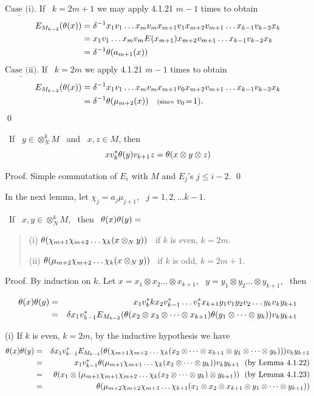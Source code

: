 \ni${\underline{\mbox{Case (i)}}}$. If \ $k=2m+1$ we may apply
4.1.21
$m\!-\!1$ times to obtain
\begin{eqnarray*}
E_{M_{k-2}}(\theta(x)) & = \delta^{-1}x_1v_1\dots x_mv_m x_{m+1}v_1
x_{m+2}v_{m+1}\dots x_{k-1}v_{k-2}x_k\\
&= x_1v_1\dots x_mv_m E(x_{m+1})x_{m+2}v_{m+1}\dots
x_{k-1}v_{k-2}x_k \\
&= \delta^{-1}\theta(a_{m+1}(x))
\end{eqnarray*}
${\underline{\mbox{Case (ii)}}}$. If \ $k=2m$ we  apply 4.1.21
$m\!-\!1$ times to obtain
\begin{eqnarray*}
E_{M_{k-2}}(\theta(x)) & = \delta^{-1}x_1v_1\dots x_mv_m x_{m+1}v_0
 x_{m+2}v_{m+1}\dots x_{k-1}v_{k-2}x_k\\
&= \delta^{-1}\theta(\mu_{m+2}(x)) \quad {\scriptstyle{\rm (since}} \ v_0\!=\!1).
\end{eqnarray*}
\qed

\bs
{} \ If \ $y\in \otimes^k_N M$ \ and \
$x,z\in M$, then
$$
xv^*_k\theta(y)v_{k+1}z=\theta(x\otimes y\otimes z)
$$

\bs
{\sc Proof.} Simple commutation of $E_i$ with $M$ and $E_j$'s
$j\leq i-2$. \qed

\bs
In the next lemma, let $\chi_j=a_j\mu_{j+1}$, \
$j=1,2,\dots k-1$.

\bs
{} \ If \ $x,y\in \otimes^k_N M$, \ then \
$\theta(x)\theta(y)=$
\begin{verse}
(i) $\theta(\chi_{m+1}\chi_{m+2}\dots\chi_k(x\otimes_N y))$ \
if $k$ is even, $k=2m$.

(ii) $\theta(\mu_{m+2}\chi_{m+2}\dots\chi_k(x\otimes_N y))$ \
if $k$ is odd, $k=2m+1$.
\end{verse}

\bs
{\sc Proof.}  By induction on $k$. Let $x=x_1\otimes
x_2\dots\otimes x_{k+1}$, \ $y=y_1\otimes
y_2\dots\otimes y_{k+1}$, \ then

\begin{eqnarray*}
\theta(x)\theta(y) & = & x_1v^*_k kx_2v^*_{k-1}\dots v^*_1x_{k+1}y_1v_1y_2v_2 \dots y_kv_ky_{k+1} \\
&= & \delta x_1v^*_{k-1} E_{M_{k-2}}(\theta(x_2\otimes x_3\otimes\dots\otimes x_{k+1})\theta(y_1\otimes\dots\otimes y_k))
v_ky_{k+1}
\end{eqnarray*}

(i) If $k$ is even, $k=2m$, by the inductive hypothesis we have
\begin{eqnarray*}
\th(x)\th(y) & = &\d x_1v^*_{k-1} E_{M_{k-2}} (\th(\chi_{m+1}\chi_{m+2}\dots\chi_k(x_2\otimes\dots\otimes x_{k+1}\otimes y_1\otimes\dots\otimes y_k)))v_ky_{k+1} \\
& = & x_1v^*_{k-1} \th(\mu_{m+1}\chi_{m+1}\dots\chi_k (x_2\otimes\dots\otimes y_k))v_ky_{k+1} \ \ \mbox{(by\  Lemma\ 4.1.22)}\\
& = &\th(x_1\otimes (\mu_{m+1}\chi_{m+1}\chi_{m+2}\dots \chi_k(x_2\otimes\dots\otimes y_k)\otimes y_{k+1})) \ \ \mbox{(by Lemma 4.1.23)}\\
& = &\th(\mu_{m+2}\chi_{m+2}\chi_{m+3}\dots \chi_{k+1}(x_1\otimes x_2\otimes x_{k+1}\otimes y_1 \otimes\dots\otimes y_{k+1}))
\end{eqnarray*}

